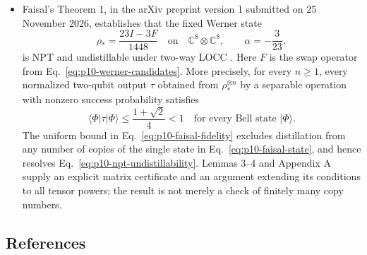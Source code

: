 \begin{itemize}
  \item Faisal's Theorem 1, in the arXiv preprint version 1 submitted on
25 November 2026, establishes that the fixed Werner state
\begin{equation}
  \rho_* = \frac{23I-3F}{1448}
  \quad\text{on}\quad \mathbb C^8\otimes\mathbb C^8,
  \qquad \alpha=-\frac{3}{23},
  \label{eq:p10-faisal-state}
\end{equation}
is NPT and undistillable under two-way LOCC
.
Here $F$ is the swap operator from Eq.~\eqref{eq:p10-werner-candidates}.
More precisely, for every $n\geq1$, every normalized two-qubit output
$\tau$ obtained from $\rho_*^{\otimes n}$ by a separable operation
with nonzero success probability satisfies
\begin{equation}
  \langle\Phi\rvert\tau\lvert\Phi\rangle
  \leq \frac{1+\sqrt2}{4}<1
  \quad\text{for every Bell state }\lvert\Phi\rangle.
  \label{eq:p10-faisal-fidelity}
\end{equation}
The uniform bound in Eq.~\eqref{eq:p10-faisal-fidelity} excludes
distillation from any number of copies of the single state in
Eq.~\eqref{eq:p10-faisal-state}, and hence resolves
Eq.~\eqref{eq:p10-npt-undistillability}.
Lemmas 3--4 and Appendix A supply an explicit matrix certificate and
an argument extending its conditions to all tensor powers; the result
is not merely a check of finitely many copy numbers.
\end{itemize}

\subsection*{References}

